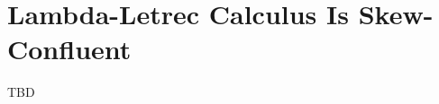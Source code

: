 



















































\section{Lambda-Letrec Calculus Is Skew-Confluent}

TBD
